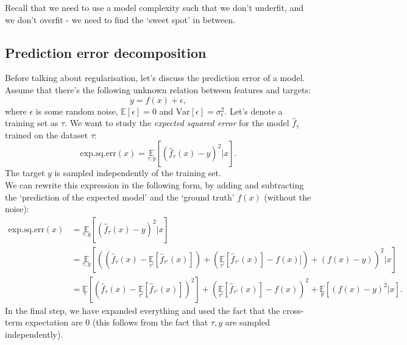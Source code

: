 Recall that we need to use a model complexity such that we don't underfit, and we don't overfit - we need to find the `sweet spot' in between.

\minirule

\subsection{Prediction error decomposition}
Before talking about regularisation, let's discuss the prediction error of a model. Assume that there's the following unknown relation between features and targets:
\begin{equation*}
y = f(x) + \epsilon,
\end{equation*}
where $\epsilon$ is some random noise, $\mathbb{E}[\epsilon] = 0$ and $\textrm{Var}[\epsilon] = \sigma_{\epsilon}^2$. Let's denote a training set as $\tau$. We want to study the \textit{expected squared error} for the model $\hat{f}_{\tau}$ trained on the dataset $\tau$:
\begin{equation*}
\textrm{exp.sq.err}(x) = \underset{\tau, y}{\mathbb{E}}\left[ (\hat{f}_{\tau}(x) - y )^2 | x \right].
\end{equation*}
The target $y$ is sampled independently of the training set.\\

We can rewrite this expression in the following form, by adding and subtracting the `prediction of the expected model' and the `ground truth' $f(x)$ (without the noise):
\begin{align*}
\textrm{exp.sq.err}(x) &= \underset{\tau, y}{\mathbb{E}}\left[ (\hat{f}_{\tau}(x) - y )^2 | x \right]\\[1.5ex]
&= \underset{\tau,y}{\mathbb{E}}\left[ \left( (\hat{f}_{\tau}(x) - \underset{\tau'}{\mathbb{E}}[\hat{f}_{\tau'}(x)]) + (\underset{\tau'}{\mathbb{E}}[\hat{f}_{\tau'}(x)] - f(x)]) + (f(x) - y)\right)^2 \bigg| x\right]\\[1.5ex]
&= \underset{\tau}{\mathbb{E}}\left[ \left(\hat{f}_{\tau}(x) - \underset{\tau'}{\mathbb{E}}[\hat{f}_{\tau'}(x)] \right)^2\right] + \left( \underset{\tau'}{\mathbb{E}}[\hat{f}_{\tau'}(x)] - f(x) \right)^2 + \underset{y}{\mathbb{E}}[(f(x) - y)^2 | x].
\end{align*}
In the final step, we have expanded everything and used the fact that the cross-term expectation are $0$ (this follows from the fact that $\tau, y$ are sampled independently).


